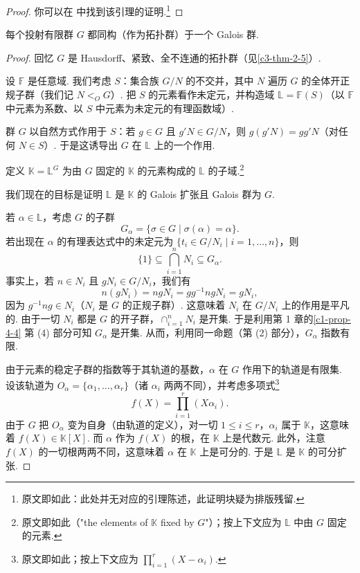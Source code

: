 \begin{proof}
你可以在 \cite[Chapter~3.3]{wil98} 中找到该引理的证明.\footnote{原文即如此：此处并无对应的引理陈述，此证明块疑为排版残留.}
\end{proof}

\begin{theorem}\label{c3-thm-3-2}
每个投射有限群 $G$ 都同构（作为拓扑群）于一个 Galois 群.
\end{theorem}

\begin{proof}
回忆 $G$ 是 Hausdorff、紧致、全不连通的拓扑群（见\autoref{c3-thm-2-5}）.

设 $\mathbb{F}$ 是任意域. 我们考虑 $S$：集合族 $G/N$ 的不交并，其中 $N$ 遍历 $G$ 的全体开正规子群（我们记 $N<_O G$）. 把 $S$ 的元素看作未定元，并构造域 $\mathbb{L}=\mathbb{F}(S)$（以 $\mathbb{F}$ 中元素为系数、以 $S$ 中元素为未定元的有理函数域）.

群 $G$ 以自然方式作用于 $S$：若 $g\in G$ 且 $g'N\in G/N$，则 $g(g'N)=gg'N$（对任何 $N\in S$）. 于是这诱导出 $G$ 在 $\mathbb{L}$ 上的一个作用.

定义 $\mathbb{K}=\mathbb{L}^G$ 为由 $G$ 固定的 $\mathbb{K}$ 的元素构成的 $\mathbb{L}$ 的子域.\footnote{原文即如此（"the elements of $\mathbb{K}$ fixed by $G$"）；按上下文应为 $\mathbb{L}$ 中由 $G$ 固定的元素.}

我们现在的目标是证明 $\mathbb{L}$ 是 $\mathbb{K}$ 的 Galois 扩张且 Galois 群为 $G$.

若 $\alpha\in\mathbb{L}$，考虑 $G$ 的子群
\[
G_\alpha=\{\sigma\in G\mid \sigma(\alpha)=\alpha\}.
\]
若出现在 $\alpha$ 的有理表达式中的未定元为 $\{t_i\in G/N_i\mid i=1,\ldots,n\}$，则
\[
\{1\}\subseteq\bigcap_{i=1}^n N_i\subseteq G_\alpha.
\]
事实上，若 $n\in N_i$ 且 $gN_i\in G/N_i$，我们有
\[
n(gN_i)=ngN_i=gg^{-1}ngN_i=gN_i,
\]
因为 $g^{-1}ng\in N_i$（$N_i$ 是 $G$ 的正规子群）. 这意味着 $N_i$ 在 $G/N_i$ 上的作用是平凡的. 由于一切 $N_i$ 都是 $G$ 的开子群，$\cap_{i=1}^n N_i$ 是开集. 于是利用第 1 章的\autoref{c1-prop-4-4} 第 (4) 部分可知 $G_\alpha$ 是开集. 从而，利用同一命题（第 (2) 部分），$G_\alpha$ 指数有限.

由于元素的稳定子群的指数等于其轨道的基数，$\alpha$ 在 $G$ 作用下的轨道是有限集. 设该轨道为 $O_\alpha=\{\alpha_1,\ldots,\alpha_r\}$（诸 $\alpha_i$ 两两不同），并考虑多项式\footnote{原文即如此；按上下文应为 $\prod_{i=1}^r(X-\alpha_i)$.}
\[
f(X)=\prod_{i=1}^r(X\alpha_i).
\]
由于 $G$ 把 $O_\alpha$ 变为自身（由轨道的定义），对一切 $1\leq i\leq r$，$\alpha_i$ 属于 $\mathbb{K}$，这意味着 $f(X)\in\mathbb{K}[X]$. 而 $\alpha$ 作为 $f(X)$ 的根，在 $\mathbb{K}$ 上是代数元. 此外，注意 $f(X)$ 的一切根两两不同，这意味着 $\alpha$ 在 $\mathbb{K}$ 上是可分的. 于是 $\mathbb{L}$ 是 $\mathbb{K}$ 的可分扩张.


\end{proof}
